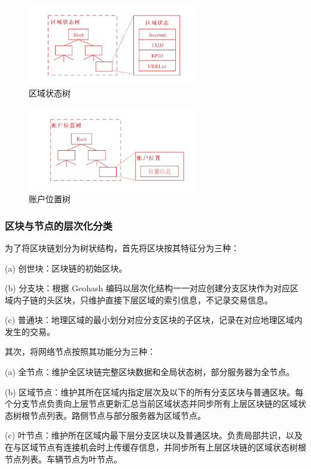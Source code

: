 \begin{figure}[h]
  \centering
  \includegraphics[width=0.65\textwidth]{figures/区域状态树}
  \caption{区域状态树}\label{fig:regionState}
\end{figure}

\begin{figure}[h]
  \centering
  \includegraphics[width=0.65\textwidth]{figures/账户位置树}
  \caption{账户位置树}\label{fig:accountLocation}
\end{figure}

\subsubsection{区块与节点的层次化分类}
为了将区块链划分为树状结构，首先将区块按其特征分为三种：

(a) 创世块：区块链的初始区块。

(b) 分支块：根据 Geohash 编码以层次化结构一一对应创建分支区块作为对应区域内子链的头区块，只维护直接下层区域的索引信息，不记录交易信息。

(c) 普通块：地理区域的最小划分对应分支区块的子区块，记录在对应地理区域内发生的交易。

其次，将网络节点按照其功能分为三种：

(a) 全节点：维护全区块链完整区块数据和全局状态树，部分服务器为全节点。

(b) 区域节点：维护其所在区域内指定层次及以下的所有分支区块与普通区块。每个分支节点负责向上层节点更新汇总当前区域状态并同步所有上层区块链的区域状态树根节点列表。路侧节点与部分服务器为区域节点。

(c) 叶节点：维护所在区域内最下层分支区块以及普通区块。负责局部共识，以及在与区域节点有连接机会时上传缓存信息，并同步所有上层区块链的区域状态树根节点列表。车辆节点为叶节点。

